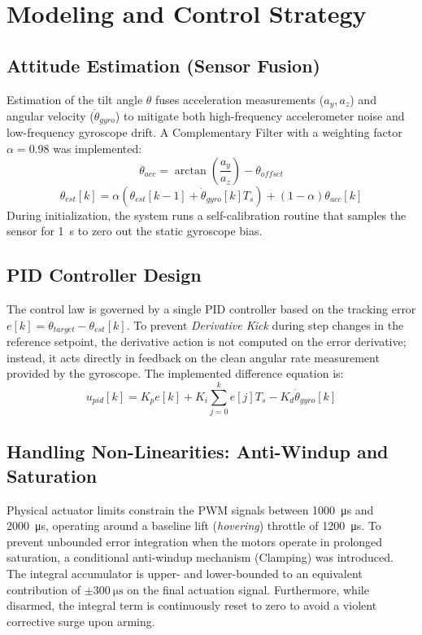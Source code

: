 \documentclass[11pt, a4paper]{article}
\begin{document}
\newpage
\section{Modeling and Control Strategy}

\subsection{Attitude Estimation (Sensor Fusion)}
Estimation of the tilt angle $\theta$ fuses acceleration measurements ($a_y, a_z$) and angular velocity ($\dot{\theta}_{gyro}$) to mitigate both high-frequency accelerometer noise and low-frequency gyroscope drift. A Complementary Filter with a weighting factor $\alpha = 0.98$ was implemented:
\begin{equation}
    \theta_{acc} = \arctan\left(\frac{a_y}{a_z}\right) - \theta_{offset}
\end{equation}
\begin{equation}
    \theta_{est}[k] = \alpha \left( \theta_{est}[k-1] + \dot{\theta}_{gyro}[k] T_s \right) + (1 - \alpha) \theta_{acc}[k]
\end{equation}
During initialization, the system runs a self-calibration routine that samples the sensor for \SI{1}{\second} to zero out the static gyroscope bias.

\subsection{PID Controller Design}
The control law is governed by a single PID controller based on the tracking error $e[k] = \theta_{target} - \theta_{est}[k]$. 
To prevent \textit{Derivative Kick} during step changes in the reference setpoint, the derivative action is not computed on the error derivative; instead, it acts directly in feedback on the clean angular rate measurement provided by the gyroscope.
The implemented difference equation is:
\begin{equation}
    u_{pid}[k] = K_p e[k] + K_i \sum_{j=0}^{k} e[j] T_s - K_d \dot{\theta}_{gyro}[k]
\end{equation}

\subsection{Handling Non-Linearities: Anti-Windup and Saturation}
Physical actuator limits constrain the PWM signals between \SI{1000}{\micro\second} and \SI{2000}{\micro\second}, operating around a baseline lift (\textit{hovering}) throttle of \SI{1200}{\micro\second}. 
To prevent unbounded error integration when the motors operate in prolonged saturation, a conditional anti-windup mechanism (Clamping) was introduced. The integral accumulator is upper- and lower-bounded to an equivalent contribution of $\pm \SI{300}{\micro\second}$ on the final actuation signal. Furthermore, while disarmed, the integral term is continuously reset to zero to avoid a violent corrective surge upon arming.
\end{document}
